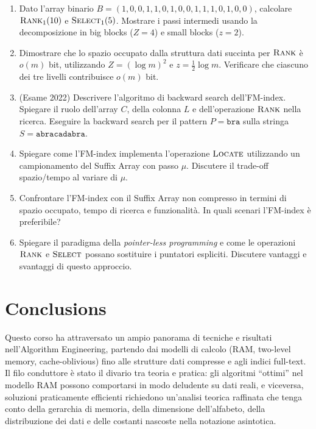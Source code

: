 \documentclass[12pt, a4paper, oneside]{book}
\theoremstyle{plain}
\theoremstyle{definition}
\theoremstyle{remark}
\begin{document}
\begin{enumerate}
  \item Dato l'array binario $B = (1,0,0,1,1,0,1,0,0,1,1,1,0,1,0,0)$, calcolare $\textsc{Rank}_1(10)$ e $\textsc{Select}_1(5)$. Mostrare i passi intermedi usando la decomposizione in big blocks ($Z = 4$) e small blocks ($z = 2$).

  \item Dimostrare che lo spazio occupato dalla struttura dati succinta per $\textsc{Rank}$ è $o(m)$ bit, utilizzando $Z = (\log m)^2$ e $z = \frac{1}{2}\log m$. Verificare che ciascuno dei tre livelli contribuisce $o(m)$ bit.

  \item (Esame 2022) Descrivere l'algoritmo di backward search dell'FM-index. Spiegare il ruolo dell'array $C$, della colonna $L$ e dell'operazione $\textsc{Rank}$ nella ricerca. Eseguire la backward search per il pattern $P = \texttt{bra}$ sulla stringa $S = \texttt{abracadabra}$.

  \item Spiegare come l'FM-index implementa l'operazione $\textsc{Locate}$ utilizzando un campionamento del Suffix Array con passo $\mu$. Discutere il trade-off spazio/tempo al variare di $\mu$.

  \item Confrontare l'FM-index con il Suffix Array non compresso in termini di spazio occupato, tempo di ricerca e funzionalità. In quali scenari l'FM-index è preferibile?

  \item Spiegare il paradigma della \emph{pointer-less programming} e come le operazioni $\textsc{Rank}$ e $\textsc{Select}$ possano sostituire i puntatori espliciti. Discutere vantaggi e svantaggi di questo approccio.
\end{enumerate}


\chapter{Conclusions}
\label{ch:conclusions}

Questo corso ha attraversato un ampio panorama di tecniche e risultati nell'Algorithm Engineering, partendo dai modelli di calcolo (RAM, two-level memory, cache-oblivious) fino alle strutture dati compresse e agli indici full-text. Il filo conduttore è stato il divario tra teoria e pratica: gli algoritmi ``ottimi'' nel modello RAM possono comportarsi in modo deludente su dati reali, e viceversa, soluzioni praticamente efficienti richiedono un'analisi teorica raffinata che tenga conto della gerarchia di memoria, della dimensione dell'alfabeto, della distribuzione dei dati e delle costanti nascoste nella notazione asintotica.
\end{document}
